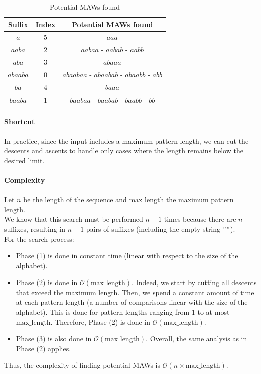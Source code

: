 \documentclass[conference]{IEEEtran}
\begin{document}
\begin{table}[htbp]
\caption{Potential MAWs found}
\begin{center}
\begin{tabular}{|c|c|c|}
\hline
\textbf{Suffix} & \textbf{Index} & \textbf{Potential MAWs found}\\
\hline
$a$ & $5$ & $aaa$\\
\hline
$aaba$ & $2$ & $aabaa$ - $aabab$ - $aabb$\\
\hline
$aba$ & $3$ & $abaaa$\\
\hline
$abaaba$ & $0$ & $abaabaa$ - $abaabab$ - $abaabb$ - $abb$\\
\hline
$ba$ & $4$ & $baaa$\\
\hline
$baaba$ & $1$ & $baabaa$ - $baabab$ - $baabb$ - $bb$\\
\hline
\end{tabular}
\end{center}
\end{table}
\paragraph{Shortcut}
In practice, since the input includes a maximum pattern length, we can cut the descents and ascents to handle only cases where the length remains below the desired limit.\\
\paragraph{Complexity}
Let $n$ be the length of the sequence and $\text{max\_length}$ the maximum pattern length.\\
We know that this search must be performed $n+1$ times because there are $n$ suffixes, resulting in $n+1$ pairs of suffixes (including the empty string $""$).\\
For the search process:
\begin{itemize}
    \item Phase (1) is done in constant time (linear with respect to the size of the alphabet).
    \item Phase (2) is done in $\mathcal{O}(\text{max\_length})$. Indeed, we start by cutting all descents that exceed the maximum length. Then, we spend a constant amount of time at each pattern length (a number of comparisons linear with the size of the alphabet). This is done for pattern lengths ranging from $1$ to at most $\text{max\_length}$. Therefore, Phase (2) is done in $\mathcal{O}(\text{max\_length})$.
    \item Phase (3) is also done in $\mathcal{O}(\text{max\_length})$. Overall, the same analysis as in Phase (2) applies.
\end{itemize}
Thus, the complexity of finding potential MAWs is $\mathcal{O}(n \times \text{max\_length})$.
\end{document}
